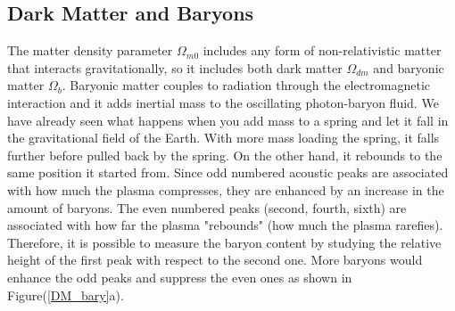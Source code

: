 \documentclass{article}
\begin{document}
%
%


\subsection{Dark Matter and Baryons}
The matter density parameter $\Omega_{m0}$ includes any form of non-relativistic matter that interacts gravitationally, so it includes both dark matter $\Omega_{dm}$ and baryonic matter $\Omega_{b}$.
Baryonic matter couples to radiation through the electromagnetic interaction and it adds inertial mass to the oscillating photon-baryon fluid.
We have already seen what happens when you add mass to a spring and let it fall in the gravitational field of the Earth.  
With more mass loading the spring, it falls further before pulled back by the spring. 
On the other hand, it rebounds to the same position it started from. 
Since odd numbered acoustic peaks are associated with how much the plasma compresses, they are enhanced by an increase in the amount of baryons.
The even numbered peaks (second, fourth, sixth) are associated with how far the plasma "rebounds" (how much the plasma rarefies).
Therefore, it is possible to measure the baryon content by studying the relative height of the first peak with respect to the second one.
More baryons would enhance the odd peaks and suppress the even ones as shown in Figure(\ref{DM_bary}a).\\
\end{document}
